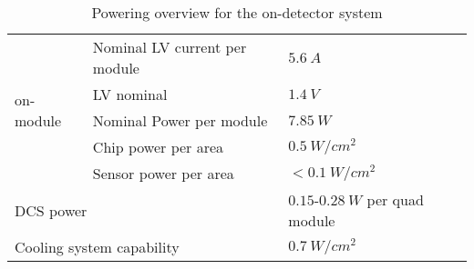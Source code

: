 \begin{table}[htbp]
  \begin{center}
    \caption[Powering overview for the on-detector system]{Powering overview for the on-detector system \cite{itk}}
    \label{tab:powering}
    \begin{tabular}{|l|l||l|}
    \hline
      \multirow{5}{*}{on-module} & Nominal LV current per module & $5.6\ \si{A}$ \\
    \cline{2-3}
      & LV nominal & $1.4\ \si{V}$ \\
    \cline{2-3}
      & Nominal Power per module & $7.85\ \si{W}$ \\
    \cline{2-3}
     & Chip power per area & $0.5\ \si{W/cm^2}$ \\
    \cline{2-3}
     & Sensor power per area & $< 0.1\ \si{W/cm^2}$ \\
    \hline
     \multicolumn{2}{|l||}{DCS power} & $0.15$-$0.28\ \si{W}$ per quad module \\
    \hline
     \multicolumn{2}{|l||}{Cooling system capability} & $0.7\ \si{W/cm^2}$ \\
    \hline
    \end{tabular}
  \end{center}
\end{table}


